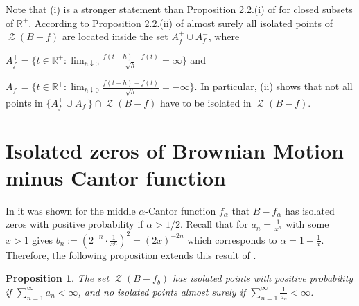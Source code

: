 \documentclass[11pt,reqno]{amsart}
\theoremstyle{plain}
\newtheorem{proposition}[theorem]{Proposition}
\theoremstyle{definition}
\theoremstyle{remark}
\begin{document}
Note that (i) is a stronger statement than Proposition 2.2.(i) of \cite{ABPR} for closed subsets of $\mathbb{R}^+$. According to Proposition 2.2.(ii) of \cite{ABPR} almost surely all isolated points of $\operatorname{\mathcal{Z}}(B-f)$ are located inside the set $A_f^+ \cup A_f^-$, where

$A_f^+ = \{t\in \mathbb{R}^+: \lim_{h \downarrow 0}\frac{f(t+h)-f(t)}{\sqrt{h}} = \infty\}$ and

$A_f^- = \{t\in \mathbb{R}^+: \lim_{h \downarrow 0}\frac{f(t+h)-f(t)}{\sqrt{h}} = -\infty\}$. In particular, (ii) shows that not all points in $\lbrace A_f^+ \cup A_f^-\rbrace \cap \operatorname{\mathcal{Z}}(B-f) $ have to be isolated in $\operatorname{\mathcal{Z}}(B-f)$.

\section{Isolated zeros of Brownian Motion minus Cantor function}

In \cite{ABPR} it was shown for the middle $\alpha$-Cantor function $f_\alpha$ that $B-f_\alpha$ has isolated zeros with positive probability if $\alpha > 1/2$. Recall that for $a_n = \frac{1}{x^{n}}$ with some $x>1$ gives $b_{n}:= (2^{-n} \cdot \frac{1}{x^{n}})^2 = (2x)^{-2n}$ which corresponds to $\alpha = 1- \frac{1}{x}$. Therefore, the following proposition extends this result of \cite{ABPR}.

\begin{proposition}
The set $\operatorname{\mathcal{Z}}(B-f_b)$ has isolated points with positive probability if $\sum_{n=1}^{\infty} a_n < \infty$, and no isolated points almost surely if $\sum_{n=1}^{\infty} \frac{1}{a_n} < \infty$.
\end{proposition}
\end{document}

